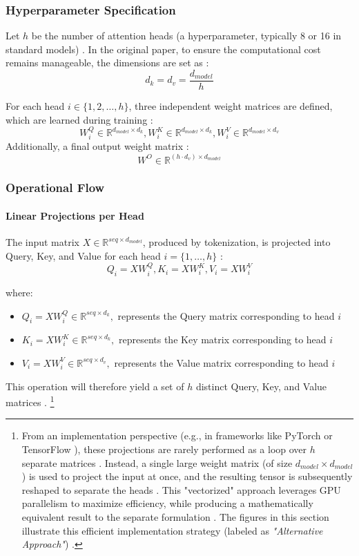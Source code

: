 \subsubsection{Hyperparameter Specification}
Let $h$ be the number of attention heads (a hyperparameter, typically 8 or 16 in standard models) \cite{arxiv-attention, stanford}. In the original paper, to ensure the computational cost remains manageable, the dimensions are set as \cite{arxiv-attention}:
\begin{equation}
d_k=d_v=\frac{d_{model}}{h}
\end{equation}

For each head $i\in\{1, 2, \dots, h\}$, three independent weight matrices are defined, which are learned during training \cite{arxiv-attention, git-hub}:
$$
W^Q_i\in \mathbb{R}^{d_{model}\times d_k}, W^K_i\in \mathbb{R}^{d_{model}\times d_k}, W^V_i\in \mathbb{R}^{d_{model}\times d_v}
$$
Additionally, a final output weight matrix \cite{arxiv-attention}:
$$
W^O \in \mathbb{R}^{(h\cdot d_v)\times d_{model}}
$$

\subsubsection{Operational Flow}
\paragraph{Linear Projections per Head}
The input matrix $X \in \mathbb{R}^{seq\times d_{model}}$, produced by tokenization, is projected into Query, Key, and Value for each head $i=\{1,\dots,h\}$ \cite{arxiv-attention, stanford}:
\begin{equation}
Q_i=XW^Q_i, K_i=XW^K_i, V_i=XW^V_i
\end{equation}

where:
\begin{itemize}
\item $Q_i=XW^Q_i \in \mathbb{R}^{seq\times d_{k}},$ represents the Query matrix corresponding to head $i$
\item $K_i=XW^K_i \in \mathbb{R}^{seq\times d_{k}},$ represents the Key matrix corresponding to head $i$
\item $V_i=XW^V_i \in \mathbb{R}^{seq\times d_{v}},$ represents the Value matrix corresponding to head $i$
\end{itemize}
This operation will therefore yield a set of $h$ distinct Query, Key, and Value matrices \cite{arxiv-attention, git-hub}. \footnote{From an implementation perspective (e.g., in frameworks like PyTorch \cite{pytorch-multiheadattention} or TensorFlow \cite{tensorflow-multiheadattention}), these projections are rarely performed as a loop over $h$ separate matrices \cite{stanford}. Instead, a single large weight matrix (of size $d_{model} \times d_{model}$) is used to project the input at once, and the resulting tensor is subsequently reshaped to separate the heads \cite{stanford, git-hub}. This "vectorized" approach leverages GPU parallelism to maximize efficiency, while producing a mathematically equivalent result to the separate formulation \cite{stanford}. The figures in this section illustrate this efficient implementation strategy (labeled as \textit{"Alternative Approach"}) \cite{git-hub, stanford}.}


